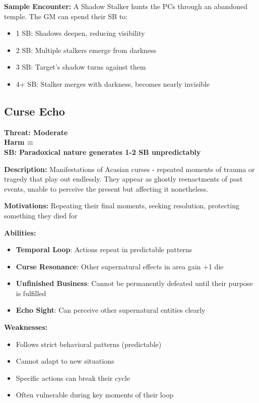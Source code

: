 \documentclass[12pt]{article}
\newcommand{\cp}[1]{\textbf{SB: #1}}
\newcommand{\harm}[1]{\textbf{Harm #1}}
\newcommand{\threat}[1]{\textbf{Threat: #1}}
\begin{document}
\textbf{Sample Encounter:}
A Shadow Stalker hunts the PCs through an abandoned temple. The GM can spend their SB to:
\begin{itemize}
\item 1 SB: Shadows deepen, reducing visibility
\item 2 SB: Multiple stalkers emerge from darkness
\item 3 SB: Target's shadow turns against them
\item 4+ SB: Stalker merges with darkness, becomes nearly invisible
\end{itemize}

\subsection*{Curse Echo}

\threat{Moderate} \\
\harm{=} \\
\cp{Paradoxical nature generates 1-2 SB unpredictably}

\vspace{0.5em}
\textbf{Description:} Manifestations of Acasian curses - repeated moments of trauma or tragedy that play out endlessly. They appear as ghostly reenactments of past events, unable to perceive the present but affecting it nonetheless.

\textbf{Motivations:} Repeating their final moments, seeking resolution, protecting something they died for

\textbf{Abilities:}
\begin{itemize}
\item \textbf{Temporal Loop}: Actions repeat in predictable patterns
\item \textbf{Curse Resonance}: Other supernatural effects in area gain +1 die
\item \textbf{Unfinished Business}: Cannot be permanently defeated until their purpose is fulfilled
\item \textbf{Echo Sight}: Can perceive other supernatural entities clearly
\end{itemize}

\textbf{Weaknesses:}
\begin{itemize}
\item Follows strict behavioral patterns (predictable)
\item Cannot adapt to new situations
\item Specific actions can break their cycle
\item Often vulnerable during key moments of their loop
\end{itemize}
\end{document}
